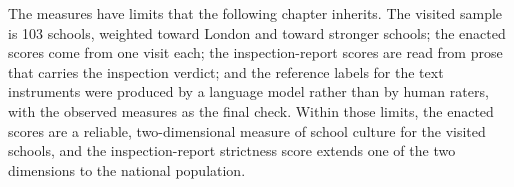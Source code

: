 The measures have limits that the following chapter inherits. The visited
sample is 103 schools, weighted toward London and toward stronger schools; the
enacted scores come from one visit each; the inspection-report scores are read
from prose that carries the inspection verdict; and the reference labels for
the text instruments were produced by a language model rather than by human
raters, with the observed measures as the final check. Within those limits,
the enacted scores are a reliable, two-dimensional measure of school culture
for the visited schools, and the inspection-report strictness score extends
one of the two dimensions to the national population.
